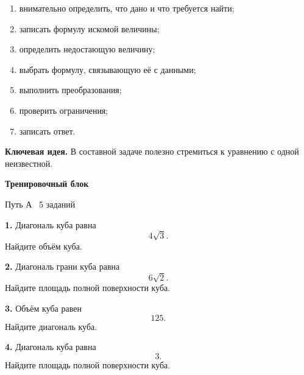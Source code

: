 \documentclass[a4paper,12pt]{article}
\newcommand{\keyidea}[1]{%
    \par\medskip
    {\bfseries\color{darkaccent}Ключевая идея.} #1
    \par\medskip
}
\begin{document}
\begin{enumerate}

\item
внимательно определить, что дано и что требуется найти;

\item
записать формулу искомой величины;

\item
определить недостающую величину;

\item
выбрать формулу, связывающую её с данными;

\item
выполнить преобразования;

\item
проверить ограничения;

\item
записать ответ.

\end{enumerate}

\keyidea{
В составной задаче полезно стремиться к уравнению с одной неизвестной.
}

\clearpage
\thispagestyle{fancy}

\begin{center}

{\LARGE\bfseries\color{darkaccent}
Тренировочный блок
}

\vspace{2mm}

{\large
Путь А
\textbullet\
5 заданий
}

\end{center}

\vspace{7mm}

\textbf{1.}
Диагональ куба равна
\[
4\sqrt3.
\]
Найдите объём куба.

\vspace{5mm}

\textbf{2.}
Диагональ грани куба равна
\[
6\sqrt2.
\]
Найдите площадь полной поверхности куба.

\vspace{5mm}

\textbf{3.}
Объём куба равен
\[
125.
\]
Найдите диагональ куба.

\vspace{5mm}

\textbf{4.}
Диагональ куба равна
\[
3.
\]
Найдите площадь полной поверхности куба.
\end{document}
